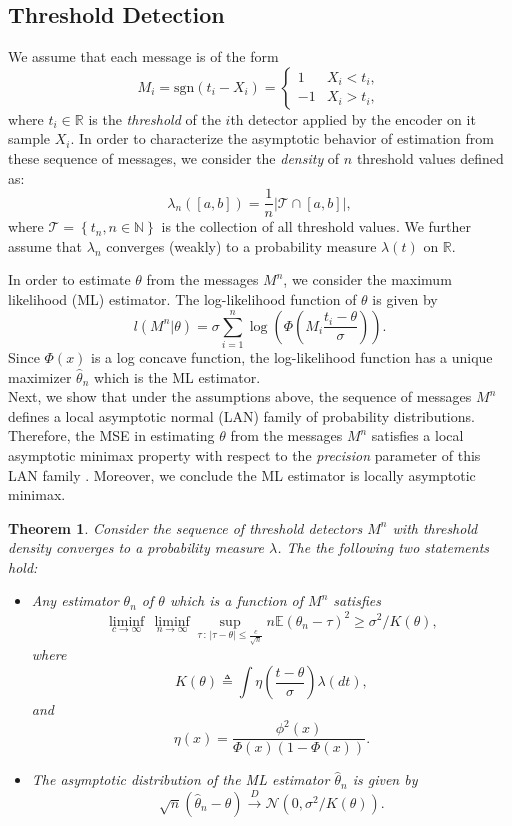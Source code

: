 \documentclass[letterpaper, conference]{IEEEtran}      %
\newtheorem{thm}{\bf{Theorem}}
\newcommand{\sgn}{\mathrm{sgn} }
\begin{document}
\subsection{Threshold Detection}
We assume that each message is of the form
\[
M_i = \sgn(t_i - X_i) = \begin{cases} 1 & X_i< t_i, \\
-1 & X_i > t_i,
\end{cases}  
\]
where $t_i\in\mathbb R$ is the \emph{threshold} of the $i$th detector applied by the encoder on it sample $X_i$. In order to characterize the asymptotic behavior of estimation from these sequence of messages, we consider the \emph{density} of $n$ threshold values defined as:
\[
\lambda_n([a,b]) = \frac{1}{n} \left| \mathcal T \cap [a,b] \right|,
\]
where $\mathcal T  = \left\{t_n, n \in \mathbb N \right\}$ is the collection of all threshold values. We further assume that $\lambda_n$ converges (weakly) to a probability measure $\lambda(t)$ on $\mathbb R$.  \par
In order to estimate $\theta$ from the messages $M^n$, we consider the maximum likelihood (ML) estimator. The log-likelihood function of $\theta$ is given by
\[
l(M^n  |\theta ) = \sigma  \sum_{i=1}^n \log \left( \Phi \left( M_i \frac{t_i - \theta}{\sigma} \right) \right). 
\]
Since $\Phi(x)$ is a log concave function, the log-likelihood function has a unique maximizer $\widehat{\theta}_n$ which is the ML estimator.  \\

Next, we show that under the assumptions above, the sequence of messages $M^n$ defines a local asymptotic normal (LAN) family of probability distributions. Therefore, the MSE in estimating $\theta$ from the messages $M^n$ satisfies a local asymptotic minimax property with respect to the \emph{precision} parameter of this LAN family \cite{van2000asymptotic}. Moreover, we conclude the ML estimator is locally asymptotic minimax. 

\begin{thm} \label{thm:LAN}
Consider the sequence of threshold detectors $M^n$ with threshold density converges to a probability measure $\lambda$. The the following two statements hold:
\begin{itemize}
\item[(i)] Any estimator ${\theta}_n$ of $\theta$ which is a function of $M^n$ satisfies
\[
\liminf_{c\rightarrow \infty}\, \liminf_{n\rightarrow \infty} \sup_{\tau\,:\,| \tau - \theta| \leq \frac{c}{\sqrt{n}} }  n \mathbb E \left({\theta}_n - \tau \right)^2 \geq \sigma^2/K(\theta),
\]
where 
\[
K(\theta) \triangleq \int \eta\left(\frac{t-\theta}{\sigma} \right) \lambda(dt),
\]
and 
\[
 \eta(x) = \frac{ \phi^2\left( x \right)}{ \Phi\left( x \right) \left(1-\Phi\left(x\right) \right)}. 
\]
\item[(ii)] The asymptotic distribution of the ML estimator $\widehat{\theta}_n$ is given by
\[
\sqrt{n}(\widehat{\theta}_n - \theta) \overset{D}{\rightarrow} \mathcal N\left(0,\sigma^2/K(\theta) \right).
\]
\end{itemize}
\end{thm}
\end{document}

